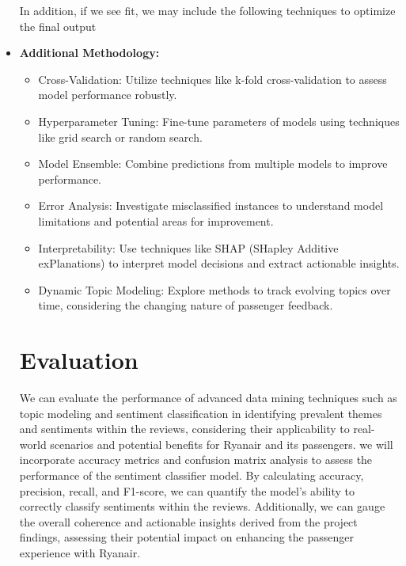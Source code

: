 \documentclass[11pt]{article} %
\begin{document}
\begin{itemize}
In addition, if we see fit, we may include the following techniques to optimize the final output

\item \textbf{Additional Methodology:}
\begin{itemize}[label={}, leftmargin=*]
    \item Cross-Validation: Utilize techniques like k-fold cross-validation to assess model performance robustly.
    \item Hyperparameter Tuning: Fine-tune parameters of models using techniques like grid search or random search.
    \item Model Ensemble: Combine predictions from multiple models to improve performance.
    \item Error Analysis: Investigate misclassified instances to understand model limitations and potential areas for improvement.
    \item Interpretability: Use techniques like SHAP (SHapley Additive exPlanations) to interpret model decisions and extract actionable insights.
    \item Dynamic Topic Modeling: Explore methods to track evolving topics over time, considering the changing nature of passenger feedback.
\end{itemize}





\section{Evaluation}
We can evaluate the performance of advanced data mining techniques such as topic modeling and sentiment classification in identifying prevalent themes and sentiments within the reviews, considering their applicability to real-world scenarios and potential benefits for Ryanair and its passengers. we will incorporate accuracy metrics and confusion matrix analysis to assess the performance of the sentiment classifier model. By calculating accuracy, precision, recall, and F1-score, we can quantify the model's ability to correctly classify sentiments within the reviews. 
Additionally, we can gauge the overall coherence and actionable insights derived from the project findings, assessing their potential impact on enhancing the passenger experience with Ryanair.

\vspace{5em}


\begin{thebibliography}{5}


\end{thebibliography}
\end{itemize}
\end{document}
